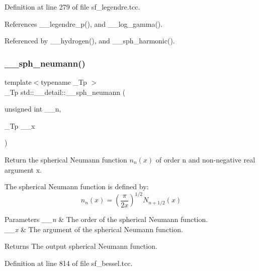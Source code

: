 Definition at line 279 of file sf\+\_\+legendre.\+tcc.



References \+\_\+\+\_\+legendre\+\_\+p(), and \+\_\+\+\_\+log\+\_\+gamma().



Referenced by \+\_\+\+\_\+hydrogen(), and \+\_\+\+\_\+sph\+\_\+harmonic().

\mbox{\label{namespacestd_1_1____detail_a94ac68003333b86b157a3b1e6ce44830}} 
\subsubsection{\texorpdfstring{\+\_\+\+\_\+sph\+\_\+neumann()}{\_\_sph\_neumann()}\hspace{0.1cm}{\footnotesize\ttfamily [1/2]}}
{\footnotesize\ttfamily template$<$typename \+\_\+\+Tp $>$ \\
\+\_\+\+Tp std\+::\+\_\+\+\_\+detail\+::\+\_\+\+\_\+sph\+\_\+neumann (\begin{DoxyParamCaption}\item[{unsigned int}]{\+\_\+\+\_\+n,  }\item[{\+\_\+\+Tp}]{\+\_\+\+\_\+x }\end{DoxyParamCaption})}



Return the spherical Neumann function $ n_n(x) $ of order n and non-\/negative real argument {\ttfamily x}. 

The spherical Neumann function is defined by\+: \[ n_n(x) = \left(\frac{\pi}{2x} \right) ^{1/2} N_{n+1/2}(x) \]


\begin{DoxyParams}{Parameters}
{\em \+\_\+\+\_\+n} & The order of the spherical Neumann function. \\
\hline
{\em \+\_\+\+\_\+x} & The argument of the spherical Neumann function. \\
\hline
\end{DoxyParams}
\begin{DoxyReturn}{Returns}
The output spherical Neumann function. 
\end{DoxyReturn}


Definition at line 814 of file sf\+\_\+bessel.\+tcc.



